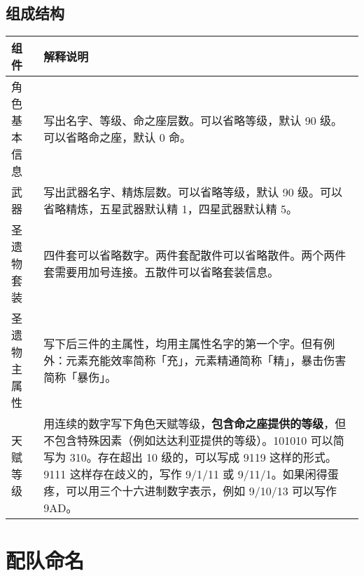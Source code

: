 \subsection{组成结构}

\noindent\begin{tabu} {|l|X|}
	\hline
	{组件}         & {解释说明}                                                                                                                                                                                                                                                                                      \\
	\hline
	{角色基本信息} & {写出名字、等级、命之座层数。可以省略等级，默认 90 级。可以省略命之座，默认 0 命。}                                                                                                                                                                                                             \\
	{武器}         & {写出武器名字、精炼层数。可以省略等级，默认 90 级。可以省略精炼，五星武器默认精 1，四星武器默认精 5。}                                                                                                                                                                                          \\
	{圣遗物套装}   & {四件套可以省略数字。两件套配散件可以省略散件。两个两件套需要用加号连接。五散件可以省略套装信息。}                                                                                                                                                                                              \\
	{圣遗物主属性} & {写下后三件的主属性，均用主属性名字的第一个字。但有例外：元素充能效率简称「充」，元素精通简称「精」，暴击伤害简称「暴伤」。}                                                                                                                                                                    \\
	{天赋等级}     & {用连续的数字写下角色天赋等级，\textbf{包含命之座提供的等级}，但不包含特殊因素（例如达达利亚提供的等级）。101010 可以简写为 310。存在超出 10 级的，可以写成 9119 这样的形式。9111 这样存在歧义的，写作 9/1/11 或 9/11/1。如果闲得蛋疼，可以用三个十六进制数字表示，例如 9/10/13 可以写作 9AD。} \\
	\hline
\end{tabu}


\section{配队命名}

